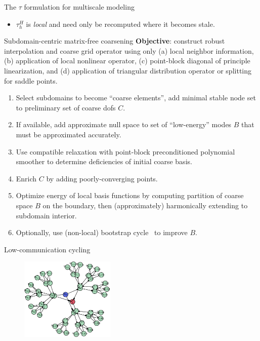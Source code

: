 \documentclass[final,t]{beamer}
\begin{document}
\begin{frame}{}
\begin{columns}
\begin{column}{0.31\textwidth}
\begin{block}{The $\tau$ formulation for multiscale modeling}
\begin{itemize}
          thus $\tau_h^H$ is the ``fine grid feedback'' that makes the coarse grid equation accurate.
        \item $\tau_h^H$ is \emph{local} and need only be recomputed where it becomes stale.
        \end{itemize}
      \end{block}
      \vspace{-2.4em}
      \begin{block}{Subdomain-centric matrix-free coarsening}
        {\bf Objective}: construct robust interpolation and coarse grid operator using only (a) local neighbor information, (b) application of local nonlinear operator, (c) point-block diagonal of principle linearization, and (d) application of triangular distribution operator or splitting~\cite{bkmms2012} for saddle points.
        \begin{enumerate}
        \item Select subdomains to become ``coarse elements'', add minimal stable node set to preliminary set of coarse dofs $C$.
        \item If available, add approximate null space to set of ``low-energy'' modes $B$ that must be approximated accurately.
        \item Use compatible relaxation with point-block preconditioned polynomial smoother to determine deficiencies of initial coarse basis.
        \item Enrich $C$ by adding poorly-converging points.
        \item Optimize energy of local basis functions by computing partition of coarse space $B$ on the boundary, then (approximately) harmonically extending to subdomain interior.
        \item Optionally, use (non-local) bootstrap cycle~\cite{brandt2011bootstrap} to improve $B$.
        \end{enumerate}
      \end{block}
      \vspace{-2.4em}
      \begin{block}{Low-communication cycling}
            \begin{figure}
              \includegraphics[width=0.4\textwidth]{figures/MG/TauDeps.pdf}

\end{figure}
\end{block}
\end{column}
\end{columns}
\end{frame}
\end{document}
